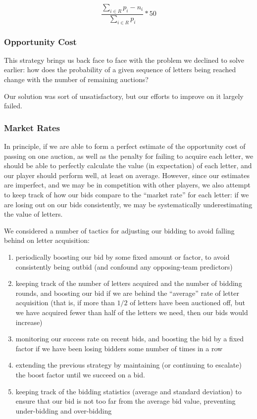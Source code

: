\documentclass[11pt]{article}
\begin{document}
$$\frac{\sum_{i \in R}p_i - n_i}{\sum_{i \in R}p_i} * 50$$

\subsubsection{Opportunity Cost}

This strategy brings us back face to face with the problem we declined to solve earlier: how does the probability of a given sequence of letters being reached change with the number of remaining auctions?  

Our solution was sort of unsatisfactory, but our efforts to improve on it largely failed.

\subsubsection{Market Rates}

In principle, if we are able to form a perfect estimate of the opportunity cost of passing on one auction, as well as the penalty for failing to acquire each letter, we should be able to perfectly calculate the value (in expectation) of each letter, and our player should perform well, at least on average.  However, since our estimates are imperfect, and we may be in competition with other players, we also attempt to keep track of how our bids compare to the ``market rate'' for each letter: if we are losing out on our bids consistently, we may be systematically underestimating the value of letters.

We considered a number of tactics for adjusting our bidding to avoid falling behind on letter acquisition:

\begin{enumerate}
\item{} periodically boosting our bid by some fixed amount or factor, to avoid consistently being outbid (and confound any opposing-team predictors)
\item{} keeping track of the number of letters acquired and the number of bidding rounds, and boosting our bid if we are behind the ``average'' rate of letter acquisition (that is, if more than $1/2$ of letters have been auctioned off, but we have acquired fewer than half of the letters we need, then our bids would increase)
\item monitoring our success rate on recent bids, and boosting the bid by a fixed factor if we have been losing bidders some number of times in a row
\item extending the previous strategy by maintaining (or continuing to escalate) the boost factor until we succeed on a bid.
\item keeping track of the bidding statistics (average and standard deviation) to ensure that our bid is not too far from the average bid value, preventing under-bidding and over-bidding
\end{enumerate}
\end{document}
